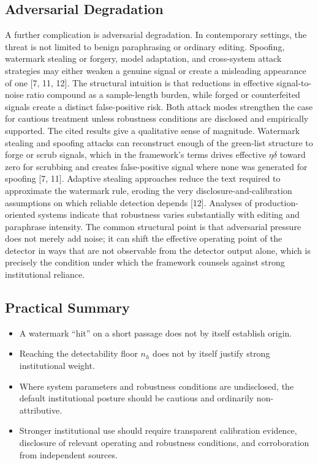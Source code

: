 \documentclass[11pt]{article}
\begin{document}
\subsection{Adversarial Degradation}
A further complication is adversarial degradation. In contemporary settings, the
threat is not limited to benign paraphrasing or ordinary editing. Spoofing,
watermark stealing or forgery, model adaptation, and cross-system attack strategies
may either weaken a genuine signal or create a misleading appearance of one
[7, 11, 12]. The structural intuition is that reductions in effective
signal-to-noise ratio compound as a sample-length burden, while forged or
counterfeited signals create a distinct false-positive risk. Both attack modes
strengthen the case for cautious treatment unless robustness conditions are disclosed
and empirically supported.
The cited results give a qualitative sense of magnitude. Watermark stealing and
spoofing attacks can reconstruct enough of the green-list structure to forge or scrub
signals, which in the framework's terms drives effective $\eta\delta$ toward zero for
scrubbing and creates false-positive signal where none was generated for spoofing
[7, 11]. Adaptive stealing approaches reduce the text required to approximate the
watermark rule, eroding the very disclosure-and-calibration assumptions on which
reliable detection depends [12]. Analyses of production-oriented systems indicate
that robustness varies substantially with editing and paraphrase intensity. The
common structural point is that adversarial pressure does not merely add noise; it
can shift the effective operating point of the detector in ways that are not
observable from the detector output alone, which is precisely the condition under
which the framework counsels against strong institutional reliance.
\subsection{Practical Summary}
\begin{itemize}[leftmargin=2em]
\item A watermark ``hit'' on a short passage does not by itself establish origin.
\item Reaching the detectability floor $n_h$ does not by itself justify strong
institutional weight.
\item Where system parameters and robustness conditions are undisclosed, the default
institutional posture should be cautious and ordinarily non-attributive.
\item Stronger institutional use should require transparent calibration evidence,
disclosure of relevant operating and robustness conditions, and corroboration from
independent sources.
\end{itemize}
\end{document}
